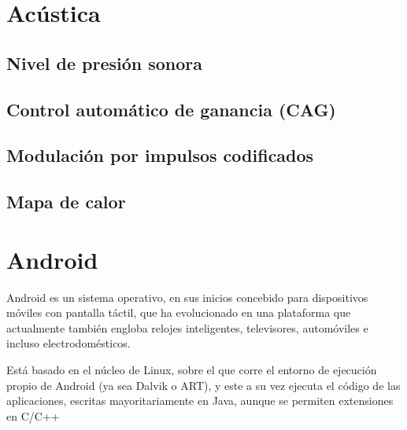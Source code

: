 \label{chp:ManLaTeX}
\minitoc

\begin{sinopsis}
\label{sec:chpltx:sinop}
	
\end{sinopsis}

\section{Acústica}
\label{sec:RuidoAmb}

\subsection{Nivel de presión sonora}

\subsection{Control automático de ganancia (CAG)}

\subsection{Modulación por impulsos codificados}

\subsection{Mapa de calor}

\section{Android}
\label{sec:AndroidIntro}

Android es un sistema operativo, en sus inicios concebido para dispositivos móviles con pantalla táctil, que ha evolucionado en una plataforma que actualmente también engloba relojes inteligentes, televisores, automóviles e incluso electrodomésticos.

Está basado en el núcleo de Linux, sobre el que corre el entorno de ejecución propio de Android (ya sea Dalvik o ART), y este a su vez ejecuta el código de las aplicaciones, escritas mayoritariamente en Java, aunque se permiten extensiones en C/C++

